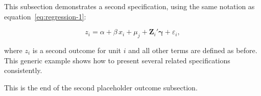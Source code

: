 
This subsection demonstrates a second specification, using the same
notation as equation~\eqref{eq:regression-1}:

\begin{equation}
z_i = \alpha + \beta \, x_i + \mu_j + \mathbf{Z}_i'
\boldsymbol{\gamma} + \varepsilon_i ,
\label{eq:regression-2}
\end{equation}

where $z_i$ is a second outcome for unit $i$ and all other terms are defined
as before. This generic example shows how to present several related
specifications consistently.

This is the end of the second placeholder outcome subsection.
